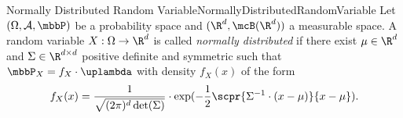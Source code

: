 \begin{mdef}{Normally Distributed Random Variable}{NormallyDistributedRandomVariable}
    Let $(\Omega, \mathcal{A}, \mbbP)$ be a probability space and $(\R^d,\mcB(\R^d))$ a measurable space. A random variable $X: \Omega \to \R^d$ is called \emph{normally distributed} if there exist $\mu\in \R^d$ and $\Sigma\in\R^{d\times d}$ positive definite and symmetric such that $\mbbP_X= f_X\cdot\uplambda$ with density $f_X(x)$ of the form
    \[
        f_X(x) = \frac{1}{\sqrt{(2\pi)^d\det(\Sigma)}}\cdot\exp(-\frac{1}{2}\scpr{\Sigma^{-1}\cdot(x-\mu)}{x-\mu}).
    \]
\end{mdef}